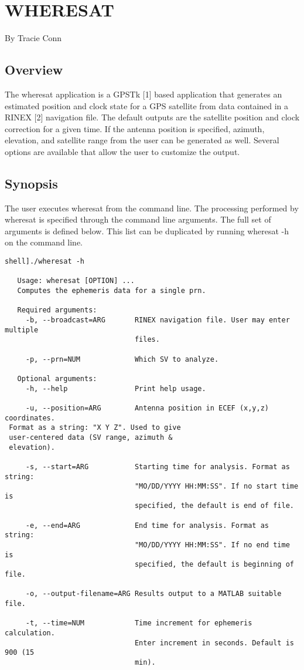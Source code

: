\chapter{WHERESAT}

By Tracie Conn


\section{Overview}
The wheresat application is a GPSTk [1] based application that generates an
estimated position and clock state for a GPS satellite from data contained in
a RINEX [2] navigation file.  The default outputs are the satellite position
and clock correction for a given time.  If the antenna position is specified,
azimuth, elevation, and satellite range from the user can be generated as
well.  Several options are available that allow the user to customize the
output.

\section{Synopsis}
The user executes wheresat from the command line.  The processing performed by
wheresat is specified through the command line arguments.  The full set of
arguments is defined below.  This list can be duplicated by running wheresat
-h on the command line.  

\begin{verbatim}
shell]./wheresat -h

   Usage: wheresat [OPTION] ...
   Computes the ephemeris data for a single prn.

   Required arguments:
     -b, --broadcast=ARG       RINEX navigation file. User may enter multiple
                               files.

     -p, --prn=NUM             Which SV to analyze.

   Optional arguments:
     -h, --help                Print help usage.

     -u, --position=ARG        Antenna position in ECEF (x,y,z) coordinates. 
 Format as a string: "X Y Z". Used to give           
 user-centered data (SV range, azimuth & 
 elevation).

     -s, --start=ARG           Starting time for analysis. Format as string:
                               "MO/DD/YYYY HH:MM:SS". If no start time is
                               specified, the default is end of file.

     -e, --end=ARG             End time for analysis. Format as string:   
                               "MO/DD/YYYY HH:MM:SS". If no end time is   
                               specified, the default is beginning of file.

     -o, --output-filename=ARG Results output to a MATLAB suitable file.

     -t, --time=NUM            Time increment for ephemeris calculation.     
                               Enter increment in seconds. Default is 900 (15  
                               min).
\end{verbatim}

